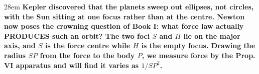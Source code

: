 \documentclass[border=4pt]{standalone}
\begin{document}
\begin{varwidth}{28em}
\large\bfseries
Kepler discovered that the planets sweep out \textcolor{ellblue}{ellipses}, not circles,      with the Sun sitting at one focus rather than at the centre. Newton now poses      the crowning question of Book I: what force law actually PRODUCES such an orbit?      The two \textcolor{fociorange}{foci $S$ and $H$} lie on the major axis, and $S$ is the force      centre while $H$ is the empty focus. Drawing the \textcolor{radgreen}{radius $SP$} from the      force to the body $P$, we measure force by the Prop. VI apparatus and will find      it varies as $1/SP^2$.
\end{varwidth}
\end{document}

